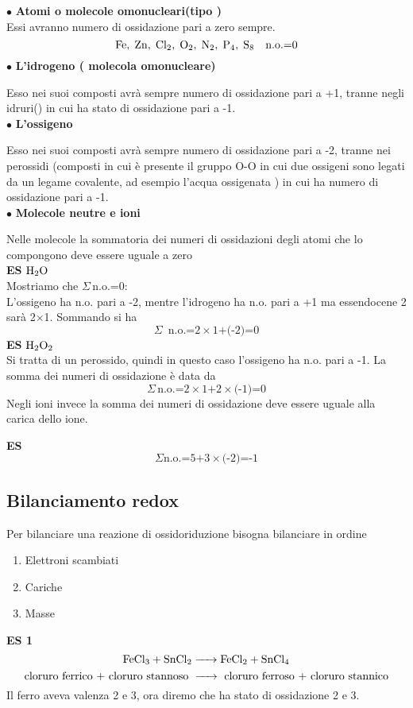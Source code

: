 $\bullet$ \textbf{Atomi o molecole omonucleari(tipo )}\\
Essi avranno numero di ossidazione pari a zero sempre.
$$\ce{Fe,\;Zn,\;Cl_2,\;O_2,\;N_2,\;P_4,\;S_8}\quad \text{n.o.=0}$$
$\bullet$  \textbf{L'idrogeno ( molecola omonucleare)}

Esso nei suoi composti avrà sempre numero di ossidazione pari a +1, tranne negli idruri() in cui ha stato di ossidazione pari a -1.\\
$\bullet$  \textbf{L'ossigeno}

Esso nei suoi composti avrà sempre numero di ossidazione pari a -2, tranne nei perossidi (composti in cui è presente il gruppo O-O in cui due ossigeni sono legati da un legame covalente, ad esempio l'acqua ossigenata ) in cui ha numero di ossidazione pari a -1.\\
$\bullet$  \textbf{Molecole neutre e ioni}

Nelle molecole la sommatoria dei numeri di ossidazioni degli atomi che lo compongono deve essere uguale a zero\\

\textbf{ES} $\ce{H_2O}\qquad$\\
Mostriamo che $\Sigma\,$n.o.=0:\\
L'ossigeno ha n.o. pari a -2, mentre l'idrogeno ha n.o. pari a +1 ma essendocene 2 sarà 2$\times$1. Sommando si ha\\
$$\Sigma\,\text{ n.o.=2} \times \text{1+(-2)=0}$$
\textbf{ES} $\ce{H_2O_2}$\\
Si tratta di un perossido, quindi in questo caso l'ossigeno ha n.o. pari a -1. La somma dei numeri di ossidazione è data da\\
$$\Sigma\,\text{n.o.=2} \times \text{1+2} \times \text{(-1)=0}$$
Negli ioni invece la somma dei numeri di ossidazione deve essere uguale alla carica dello ione.

\textbf{ES} 
$$\Sigma \text{n.o.=5+3} \times \text{(-2)=-1}$$
\subsection{Bilanciamento redox}
Per bilanciare una reazione di ossidoriduzione bisogna bilanciare in ordine
\begin{enumerate}
    \item Elettroni scambiati
    \item Cariche
    \item Masse
  \end{enumerate}
\textbf{ES 1} 
$$\ce{FeCl_3 + SnCl_2 -> FeCl_2 + SnCl_4}$$
$$\text{cloruro ferrico + cloruro stannoso \ce{->} cloruro ferroso + cloruro stannico}$$
Il ferro aveva valenza 2 e 3, ora diremo che ha stato di ossidazione 2 e 3.

